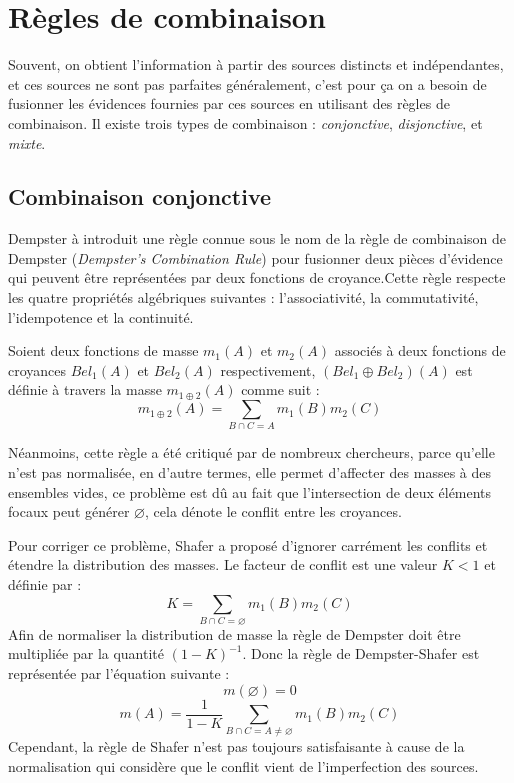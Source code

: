 \section{Règles de combinaison}

Souvent, on obtient l’information à partir des sources distincts et indépendantes,
et ces sources ne sont pas parfaites généralement, c’est pour ça on a besoin de
fusionner les évidences fournies par ces sources en utilisant des règles de
combinaison. Il existe trois types de combinaison : \emph{conjonctive},
\emph{disjonctive}, et \emph{mixte}.

\subsection{Combinaison conjonctive}

Dempster à introduit une règle connue sous le nom de la règle de combinaison
de Dempster (\emph{Dempster's Combination Rule}) pour fusionner deux pièces
d’évidence qui peuvent être représentées par deux fonctions de croyance.Cette
règle respecte les quatre propriétés algébriques suivantes : l’associativité,
la commutativité, l’idempotence et la continuité.

Soient deux fonctions de masse $m_1(A)$ et $m_2(A)$ associés à deux fonctions
de croyances $Bel_1(A)$ et $Bel_2(A)$ respectivement, $(Bel_1 \oplus Bel_2)(A)$
est définie à travers la masse $m_{1 \oplus 2}(A)$ comme suit :
\begin{equation}
m_{1 \oplus 2}(A) = \sum_{B \cap C = A} m_1(B) m_2(C)
\end{equation}

Néanmoins, cette règle a été critiqué par de nombreux chercheurs, parce qu’elle
n’est pas normalisée, en d’autre termes, elle permet d’affecter des masses à
des ensembles vides, ce problème est dû au fait que l’intersection de deux
éléments focaux peut générer $\varnothing$, cela dénote le conflit entre les croyances.

Pour corriger ce problème, Shafer a proposé d’ignorer carrément les conflits
et étendre la distribution des masses. Le facteur de conflit est une valeur
$K < 1$ et définie par :
\begin{equation}
K = \sum_{B \cap C = \varnothing} m_1(B) m_2(C)
\end{equation}
Afin de normaliser la distribution de masse la règle de Dempster doit être
multipliée par la quantité $(1 - K)^{-1}$. Donc la règle de Dempster-Shafer
est représentée par l’équation suivante :
\begin{equation}
m(\varnothing) = 0
\end{equation}
\begin{equation}
m(A) = \frac{1}{1-K} \sum_{B \cap C = A \neq \varnothing} m_1(B) m_2(C)
\end{equation}
Cependant, la règle de Shafer n’est pas toujours satisfaisante à cause de la
normalisation qui considère que le conflit vient de l’imperfection des sources.

